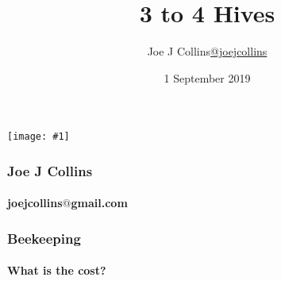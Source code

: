 \documentclass{beamer}
\title{3 to 4 Hives}
\author{Joe J Collins\newline\href{https://twitter.com/joejcollins}{@joejcollins}}
\institute{Shropshire Beekeepers Association}
\date{1 September 2019}
\newcommand{\bigpicture}[1]{%
  \begin{list}{}{%
    \vspace*{-0.58cm}%
    \setlength{\topsep}{-0pt}%
    \setlength{\leftmargin}{-1.3cm}%
    \setlength{\rightmargin}{0pt}%
    \setlength{\listparindent}{\parindent}%
    \setlength{\itemindent}{\parindent}%
    \setlength{\parsep}{\parskip}%
  }%
  \item[]%
  \vspace*{\fill}
    \texttt{[image: \#1]}%
  \vspace*{\fill}
  \end{list}%
}%
\begin{document}
\begin{frame}
\bigpicture{../Assets/BbcTestCard.jpg}
\end{frame}

\frame{\titlepage}

\begin{frame}
\frametitle{Joe J Collins}
\framesubtitle{joejcollins$@$gmail.com}

\note{}
\end{frame}

\begin{frame}
\frametitle{Beekeeping}
\framesubtitle{What is the cost?}
\begin{center}

\end{center}
\end{frame}
\end{document}
